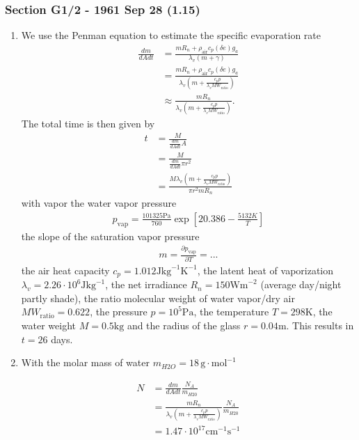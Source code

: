 \documentclass[10pt,a4paper]{article}
\theoremstyle{definition}
\begin{document}
\subsubsection{Section G1/2 - 1961 Sep 28 (1.15)}
\begin{enumerate}[label=(\alph*)]
\item  We use the Penman equation to estimate the specific evaporation rate
\begin{align}
    \frac{dm}{dA dt}
    &=\frac{m R_n + \rho_\text{air}c_p (\delta e)g_a}{\lambda_v(m+\gamma)}\\
    &=\frac{m R_n + \rho_\text{air}c_p (\delta e)g_a}{\lambda_v(m+\frac{c_p p}{\lambda_v MW_\text{ratio}})}\\
    &\approx\frac{m R_n}{\lambda_v(m+\frac{c_p p}{\lambda_v MW_\text{ratio}})}.
\end{align}
The total time is then given by
\begin{align}
    t&=\frac{M}{\frac{dm}{dA dt}A}\\
    &=\frac{M}{\frac{dm}{dA dt}\pi r^2}\\
    &=\frac{M\lambda_v(m+\frac{c_p p}{\lambda_v MW_\text{ratio}})}{\pi r^2 m R_n }
\end{align}
with vapor the water vapor pressure
\begin{align}
    p_\text{vap}=\frac{101325\text{Pa}}{760} \exp\left[20.386 - \frac{5132K}{T}\right]
\end{align}
the slope of the saturation vapor pressure
\begin{align}
    m=\frac{\partial p_\text{vap}}{\partial T}=...
\end{align}
the air heat capacity $c_p=1.012\text{J}\text{kg}^{-1}\text{K}^{-1}$, the latent heat of vaporization $\lambda_v=2.26\cdot10^6 \text{J}\text{kg}^{-1}$, the net irradiance $R_n=150\text{Wm}^{-2}$ (average day/night partly shade), the ratio molecular weight of water vapor/dry air $MW_\text{ratio}=0.622$, the pressure $p=10^5\text{Pa}$, the temperature $T= 298\text{K}$, the water weight $M=0.5\text{kg}$ and the radius of the glass $r=0.04\text{m}$. This results in $t=26$ days.

\item With the molar mass of water $m_{H2O}=18\,\text{g}\cdot\text{mol}^{-1}$

\begin{align}
    N&=\frac{dm}{dA dt} \frac{N_A}{m_{H20}}\\
    &=\frac{m R_n}{\lambda_v(m+\frac{c_p p}{\lambda_v MW_\text{ratio}})}\frac{N_A}{m_{H20}}\\
    &=1.47\cdot10^{17}\text{cm}^{-1}\text{s}^{-1}
\end{align}


\end{enumerate}
\end{document}
